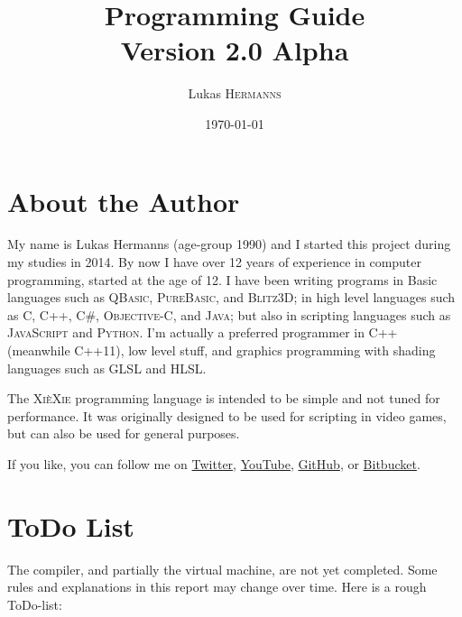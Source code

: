 \documentclass{report}
\title{\xiexie Programming Guide \\ {\normalsize Version 2.0 Alpha}}
\author{Lukas \textsc{Hermanns}}
\date{\today}
\def\xiexie{\textsc{Xi\`eXie}\xspace}
\def\xxlang{\xiexie programming language\xspace}
\def\cppx{\textsc{C++11}\xspace}
\begin{document}
\maketitle



\chapter*{About the Author}

My name is Lukas Hermanns (age-group 1990) and I started this project during my studies in 2014.
By now I have over 12 years of experience in computer programming, started at the age of 12.
I have been writing programs in Basic languages such as \textsc{QBasic}, \textsc{PureBasic}, and \textsc{Blitz3D};
in high level languages such as \textsc{C}, \textsc{C++}, \textsc{C\#}, \textsc{Objective-C}, and \textsc{Java};
but also in scripting languages such as \textsc{JavaScript} and \textsc{Python}.
I'm actually a preferred programmer in C++ (meanwhile \cppx), low level stuff, and graphics programming
with shading languages such as GLSL and HLSL.

The \xxlang is intended to be simple and not tuned for performance.
It was originally designed to be used for scripting in video games, but can also be used for
general purposes.

If you like, you can follow me on \href{https://twitter.com/LukasBanana}{Twitter},
\href{https://www.youtube.com/user/SoftPixel}{YouTube}, \href{https://github.com/LukasBanana}{GitHub},
or \href{https://bitbucket.org/LukasBanana}{Bitbucket}.



\chapter*{ToDo List}

The compiler, and partially the virtual machine, are not yet completed. Some rules and explanations in this report
may change over time. Here is a rough ToDo-list:
\end{document}
